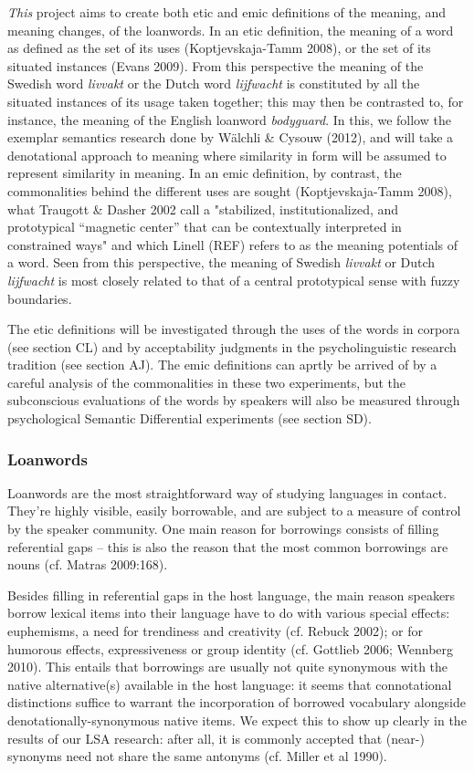 \documentclass[a4paper]{article}
\begin{document}
\emph{This} project aims to create both etic and emic definitions of the meaning, and meaning changes, of the loanwords. In an etic definition, the meaning of a word as defined as the set of its uses (Koptjevskaja-Tamm 2008), or the set of its situated instances (Evans 2009). From this perspective the meaning of the Swedish word \emph{livvakt} or the Dutch word \emph{lijfwacht} is constituted by all the situated instances of its usage taken together; this may then be contrasted to, for instance, the meaning of the English loanword \emph{bodyguard}. In this, we follow the exemplar semantics research done by W\"alchli \& Cysouw (2012), and will take a denotational approach to meaning where similarity in form will be assumed to represent similarity in meaning. In an emic definition, by contrast, the commonalities behind the different uses are sought (Koptjevskaja-Tamm 2008), what Traugott \& Dasher 2002 call a "stabilized, institutionalized, and prototypical “magnetic center” that can be contextually interpreted in constrained ways" and which Linell (REF) refers to as the meaning potentials of a word. Seen from this perspective, the meaning of Swedish \emph{livvakt} or Dutch \emph{lijfwacht} is most closely related to that of a central prototypical sense with fuzzy boundaries.

The etic definitions will be investigated through the uses of the words in corpora (see section CL) and by acceptability judgments in the psycholinguistic research tradition (see section AJ). The emic definitions can aprtly be arrived of by a careful analysis of the commonalities in these two experiments, but the subconscious evaluations of the words by speakers will also be measured through psychological Semantic Differential experiments (see section SD).




\subsubsection{Loanwords}
Loanwords are the most straightforward way of studying languages in contact. They're highly visible, easily borrowable, and are subject to a measure of control by the speaker community. One main reason for borrowings consists of filling referential gaps -- this is also the reason that the most common borrowings are nouns (cf. Matras 2009:168).

Besides filling in referential gaps in the host language, the main reason speakers borrow lexical items into their language have to do with various special effects: euphemisms, a need for trendiness and creativity (cf. Rebuck 2002); or for humorous effects, expressiveness or group identity (cf. Gottlieb 2006; Wennberg 2010). This entails that borrowings are usually not quite synonymous with the native alternative(s) available in the host language: it seems that connotational distinctions suffice to warrant the incorporation of borrowed vocabulary alongside denotationally-synonymous native items. We expect this to show up clearly in the results of our LSA research: after all, it is commonly accepted that (near-) synonyms need not share the same antonyms (cf. Miller et al 1990). 
\end{document}
